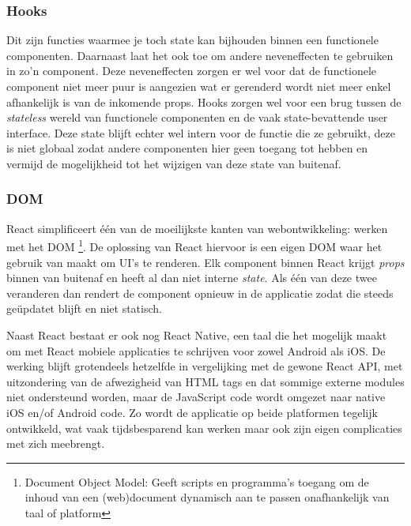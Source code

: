 \subsubsection{Hooks}
Dit zijn functies waarmee je toch state kan bijhouden binnen een functionele componenten. Daarnaast laat het ook toe om andere neveneffecten te gebruiken in zo'n component. Deze neveneffecten zorgen er wel voor dat de functionele component niet meer puur is aangezien wat er gerenderd wordt niet meer enkel afhankelijk is van de inkomende props. Hooks zorgen wel voor een brug tussen de \textit{stateless} wereld van functionele componenten en de vaak state-bevattende user interface. Deze state blijft echter wel intern voor de functie die ze gebruikt, deze is niet globaal zodat andere componenten hier geen toegang tot hebben en vermijd de mogelijkheid tot het wijzigen van deze state van buitenaf.

\subsubsection{DOM}
React simplificeert één van de moeilijkste kanten van webontwikkeling: werken met het DOM \footnote{Document Object Model: Geeft scripts en programma's toegang om de inhoud van een (web)document dynamisch aan te passen onafhankelijk van taal of platform}. De oplossing van React hiervoor is een eigen DOM waar het gebruik van maakt om UI's te renderen. Elk component binnen React krijgt \textit{props} binnen van buitenaf en heeft al dan niet interne \textit{state}. Als één van deze twee veranderen dan rendert de component opnieuw in de applicatie zodat die steeds geüpdatet blijft en niet statisch. 

Naast React bestaat er ook nog React Native, een taal die het mogelijk maakt om met React mobiele applicaties te schrijven voor zowel Android als iOS. De werking blijft grotendeels hetzelfde in vergelijking met de gewone React API, met uitzondering van de afwezigheid van HTML tags en dat sommige externe modules niet ondersteund worden, maar de JavaScript code wordt omgezet naar native iOS en/of Android code. Zo wordt de applicatie op beide platformen tegelijk ontwikkeld, wat vaak tijdsbesparend kan werken maar ook zijn eigen complicaties met zich meebrengt.

